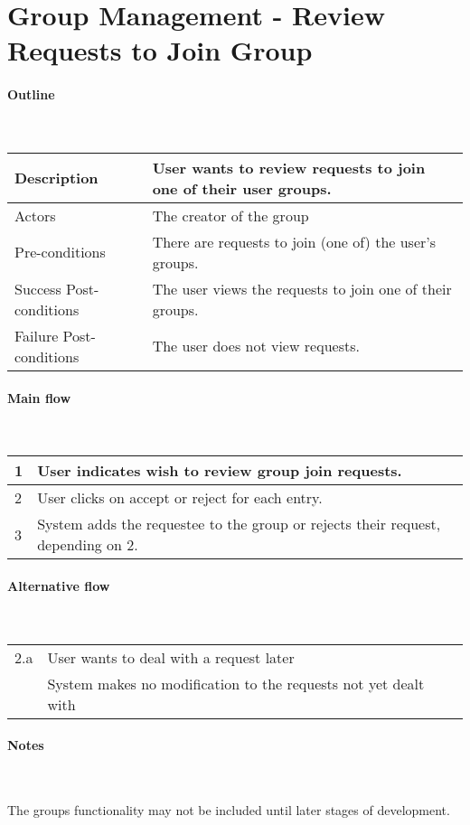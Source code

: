 \section*{Group Management - Review Requests to Join Group} %

\paragraph*{Outline} \

\begin{tabular}{ | l | l | }
\hline
Description & User wants to review requests to join one of their user groups. \\ \hline
Actors & The creator of the group \\ \hline
Pre-conditions & There are requests to join (one of) the user's groups. \\ \hline
Success Post-conditions & The user views the requests to join one of their groups. \\ \hline
Failure Post-conditions & The user does not view requests. \\ \hline
\end{tabular}


\paragraph*{Main flow} \

\begin{tabular}{ | l | l | } \hline
1 & User indicates wish to review group join requests. \\ \hline
2 & User clicks on accept or reject for each entry. \\ \hline
3 & System adds the requestee to the group or rejects their request, depending on 2. \\ \hline
\end{tabular}


\paragraph*{Alternative flow} \

\begin{tabular}{ | l | l | } \hline
2.a & User wants to deal with a request later \\ 
	& System makes no modification to the requests not yet dealt with \\ \hline
\end{tabular}

\paragraph*{Notes} \

The groups functionality may not be included until later stages of development.
